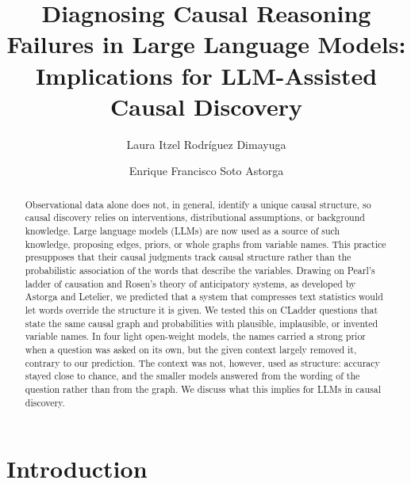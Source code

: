 \documentclass{llncs}
\begin{document}
%
\title{Diagnosing Causal Reasoning Failures in Large Language Models: Implications for LLM-Assisted Causal Discovery}
%
%
\author{Laura Itzel Rodríguez Dimayuga \and Enrique Francisco Soto Astorga}
%
%
%
\maketitle
%
\begin{abstract}
Observational data alone does not, in general, identify a unique causal structure, so causal discovery relies on interventions, distributional assumptions, or background knowledge. Large language models (LLMs) are now used as a source of such knowledge, proposing edges, priors, or whole graphs from variable names. This practice presupposes that their causal judgments track causal structure rather than the probabilistic association of the words that describe the variables. Drawing on Pearl's ladder of causation and Rosen's theory of anticipatory systems, as developed by Astorga and Letelier, we predicted that a system that compresses text statistics would let words override the structure it is given. We tested this on CLadder questions that state the same causal graph and probabilities with plausible, implausible, or invented variable names. In four light open-weight models, the names carried a strong prior when a question was asked on its own, but the given context largely removed it, contrary to our prediction. The context was not, however, used as structure: accuracy stayed close to chance, and the smaller models answered from the wording of the question rather than from the graph. We discuss what this implies for LLMs in causal discovery.

\end{abstract}
%
\section{Introduction}
\label{sec:intro}
\end{document}
